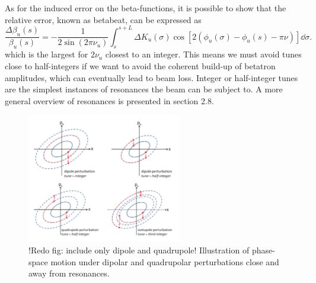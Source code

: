     As for the induced error on the beta-functions, it is possible to show that the relative error, known as betabeat, can be expressed as
     \begin{equation}
        \frac{\Delta \beta_u(s)}{\beta_u(s)} = - \frac{1}{2\sin(2\pi\nu_u)}\int_{s}^{s+L}\Delta K_u(\sigma)\cos[2(\phi_u(\sigma)-\phi_u(s)-\pi\nu)]\dd\sigma.
        \label{eq:beta_beat}
     \end{equation}
which is the largest for $2\nu_u$ closest to an integer. This means we must avoid tunes close to half-integers if we want to avoid the coherent build-up of betatron amplitudes, which can eventually lead to beam loss.
Integer or half-integer tunes are the simplest instances of resonances the beam can be subject to. A more general overview of resonances is presented in section 2.8.
\begin{figure}
    \centering
    \includegraphics[width=0.6\textwidth]{Images/resonances.png}
    \caption{!Redo fig: include only dipole and quadrupole! Illustration of phase-space motion under dipolar and quadrupolar perturbations close and away from resonances.}
\end{figure}
